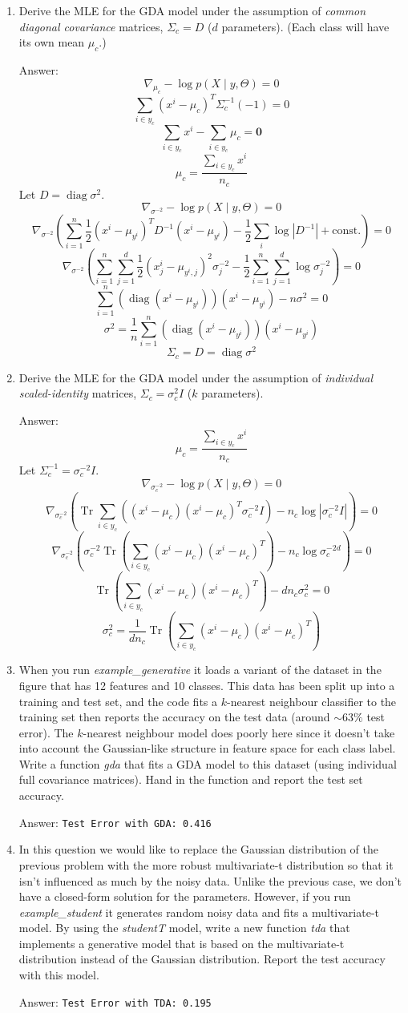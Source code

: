 \documentclass{article}
\def\ans#1{\par\gre{Answer: #1}}
\def\blu#1{{\color{blu}#1}}
\def\gre#1{{\color{gre}#1}}
\def\half{\frac 1 2}
\def\cond{\; | \;}
\DeclareMathOperator{\Tr}{Tr}
\DeclareMathOperator{\diag}{diag}
\def\enum#1{\begin{enumerate}#1\end{enumerate}}
\begin{document}
\enum{
\item \blu{Derive the MLE for the GDA model under the assumption of \emph{common diagonal covariance} matrices}, $\Sigma_c = D$ ($d$ parameters). (Each class will have its own mean $\mu_c$.)
\ans{
\[\nabla_{\mu_c} - \log p(X\cond y,\Theta) = 0\]
\[\sum_{i\in y_c}(x^i-\mu_c)^T \Sigma_c^{-1}(-1)=0\]
\[\sum_{i\in y_c}x^i - \sum_{i\in y_c}\mu_c = \mathbf{0}\]
\[\mu_c = \frac{\sum_{i\in y_c}x^i}{n_c}\]
Let $D=\diag{\sigma^2}$.
\[\nabla_{\sigma^{-2}} - \log p(X\cond y,\Theta) = 0\]
\[\nabla_{\sigma^{-2}} \left(
\sum_{i=1}^n \frac{1}{2}(x^i - \mu_{y^i})^T D^{-1} (x^i - \mu_{y^i}) 
- \half\sum_{i} \log|D^{-1}| + \text{const.}
\right) = 0\]
\[\nabla_{\sigma^{-2}} \left(
\sum_{i=1}^n \sum_{j=1}^d\frac{1}{2}(x_j^i - \mu_{y^i,j})^2 \sigma_j^{-2}
- \half\sum_{i=1}^n \sum_{j=1}^d \log\sigma_j^{-2}
\right) = 0\]
\[\sum_{i=1}^n (\diag(x^i - \mu_{y^i}))(x^i - \mu_{y^i})
- n\sigma^2 = 0\]
\[\sigma^2 = \frac{1}{n} \sum_{i=1}^n (\diag(x^i - \mu_{y^i}))(x^i - \mu_{y^i})\]
\[\Sigma_c=D=\diag\sigma^2\]
}
\item \blu{Derive the MLE for the GDA model under the assumption of \emph{individual scaled-identity} matrices}, $\Sigma_c = \sigma_c^2 I$ ($k$ parameters).
\ans{
\[\mu_c = \frac{\sum_{i\in y_c}x^i}{n_c}\]
Let $\Sigma_c^{-1}=\sigma_c^{-2}I$.
\[\nabla_{\sigma_c^{-2}} - \log p(X\cond y,\Theta) = 0\]
\[\nabla_{\sigma_c^{-2}} \left(
\Tr\sum_{i\in y_c}((x^i-\mu_c)(x^i-\mu_c)^T \sigma_c^{-2}I)
-n_c\log|\sigma_c^{-2}I| \right) = 0\]
\[\nabla_{\sigma_c^{-2}} \left(\sigma_c^{-2}
\Tr\left(\sum_{i\in y_c}(x^i-\mu_c)(x^i-\mu_c)^T\right)
-n_c\log\sigma_c^{-2d} \right) = 0\]
\[\Tr\left(\sum_{i\in y_c}(x^i-\mu_c)(x^i-\mu_c)^T\right)
-dn_c\sigma_c^{2} = 0\]
\[\sigma_c^2=\frac{1}{dn_c}
\Tr\left(\sum_{i\in y_c}(x^i-\mu_c)(x^i-\mu_c)^T\right)\]
}
\pagebreak
\item When you run \emph{example\_generative} it loads a variant of the dataset in the figure that has 12 features and 10 classes. This data has been split up into a training and test set, and the code fits a $k$-nearest neighbour classifier to the training set then reports the accuracy on the test data (around $\sim 63\%$ test error). The $k$-nearest neighbour model does poorly here since it doesn't take into account the Gaussian-like structure in feature space for each class label. Write a function \emph{gda} that fits a GDA model to this dataset (using individual full covariance matrices). \blu{Hand in the function and report the test set accuracy}.
\ans{
\texttt{Test Error with GDA: 0.416}

}
\pagebreak
\item In this question we would like to replace the Gaussian distribution of the previous problem with the more robust multivariate-t distribution so that it isn't influenced as much by the noisy data.
Unlike the previous case, we don't have a closed-form solution for the parameters. However, if you run \emph{example\_student} it generates random noisy data and fits a multivariate-t model. By using the \emph{studentT} model, write a new function \emph{tda} that implements a generative model that is based on the multivariate-t distribution instead of the Gaussian distribution. \blu{Report the test accuracy  with this model.}
\ans{
\texttt{Test Error with TDA: 0.195}

}
}
\end{document}
